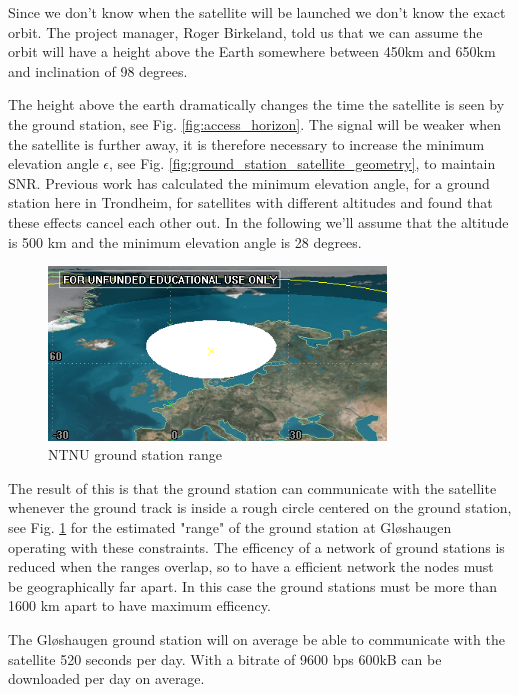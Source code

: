 Since we don't know when the satellite will be launched we don't know the exact orbit. The project manager, Roger Birkeland, told us that we can assume the orbit will  have a height above the Earth somewhere between 450km and 650km and inclination of 98 degrees.

The height above the earth dramatically changes the time the satellite is seen by the ground station, see Fig. \ref{fig:access_horizon}. The signal will be weaker when the satellite is further away, it is therefore necessary to increase the minimum elevation angle $\epsilon$, see Fig. \ref{fig:ground_station_satellite_geometry}, to maintain SNR.  Previous work\cite{antennemaster,bildemaster} has calculated the minimum elevation angle, for a ground station here in Trondheim, for satellites with different altitudes and found that these effects cancel each other out. In the following we'll assume that the altitude is 500 km and the minimum elevation angle is 28 degrees.

\begin{figure}
  \begin{center}
    \includegraphics[width=0.8\textwidth]{Figures/ntnu_footprint}
  \end{center}
  \caption[ntnu footprint]{NTNU ground station range}
  \label{fig:ntnu_range}
\end{figure}

The result of this is that the ground station can communicate with the satellite whenever the ground track is inside a rough circle centered on the ground station, see Fig. \ref{fig:ntnu_range} for the estimated "range" of the ground station at Gløshaugen operating with these constraints. The efficency of a network of ground stations is reduced when the ranges overlap, so to have a efficient network the nodes must be geographically far apart. In this case the ground stations must be more than 1600 km apart to have maximum efficency.

The Gløshaugen ground station will on average be able to communicate with the satellite 520 seconds per day. With a bitrate of 9600 bps 600kB can be downloaded per day on average.

